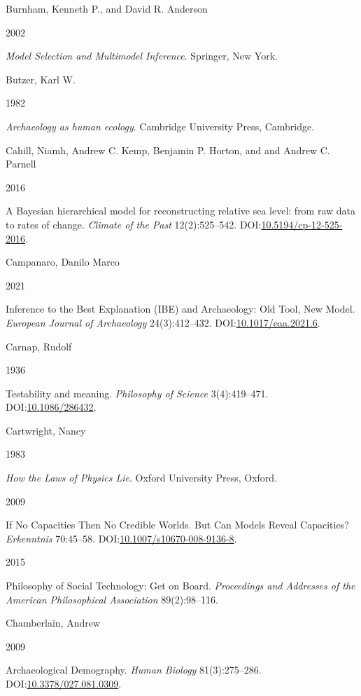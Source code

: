 \documentclass[
  12pt,
  a4paper,
  oneside]{book}
\newlength{\cslhangindent}
\newlength{\csllabelwidth}
\newlength{\cslentryspacingunit} %
\newenvironment{CSLReferences}[2] %
 {%
  \setlength{\parindent}{0pt}
  \ifodd #1
  \let\oldpar\par
  \def\par{\hangindent=\cslhangindent\oldpar}
  \fi
  \setlength{\parskip}{#2\cslentryspacingunit}
 }%
 {}
\newcommand{\CSLBlock}[1]{#1\hfill\break}
\newcommand{\CSLLeftMargin}[1]{\parbox[t]{\csllabelwidth}{#1}}
\newcommand{\CSLRightInline}[1]{\parbox[t]{\linewidth - \csllabelwidth}{#1}\break}
\begin{document}
\begin{CSLReferences}{0}{0}
\leavevmode{}%
\CSLBlock{Burnham, Kenneth P., and David R. Anderson}
\CSLLeftMargin{ 2002}%
\CSLRightInline{\emph{{Model Selection and Multimodel Inference}}. Springer, New York.}

\leavevmode{}%
\CSLBlock{Butzer, Karl W.}
\CSLLeftMargin{ 1982}%
\CSLRightInline{\emph{{Archaeology as human ecology}}. Cambridge University Press, Cambridge.}

\leavevmode{}%
\CSLBlock{Cahill, Niamh, Andrew C. Kemp, Benjamin P. Horton, and and Andrew C. Parnell}
\CSLLeftMargin{ 2016}%
\CSLRightInline{A Bayesian hierarchical model for reconstructing relative sea level: from raw data to rates of change. \emph{Climate of the Past} 12(2):525--542. DOI:\href{https://doi.org/10.5194/cp-12-525-2016}{10.5194/cp-12-525-2016}.}

\leavevmode{}%
\CSLBlock{Campanaro, Danilo Marco}
\CSLLeftMargin{ 2021}%
\CSLRightInline{{Inference to the Best Explanation (IBE) and Archaeology: Old Tool, New Model}. \emph{European Journal of Archaeology} 24(3):412--432. DOI:\href{https://doi.org/10.1017/eaa.2021.6}{10.1017/eaa.2021.6}.}

\leavevmode{}%
\CSLBlock{Carnap, Rudolf}
\CSLLeftMargin{ 1936}%
\CSLRightInline{Testability and meaning. \emph{Philosophy of Science} 3(4):419--471. DOI:\href{https://doi.org/10.1086/286432}{10.1086/286432}.}

\leavevmode{}%
\CSLBlock{Cartwright, Nancy}
\CSLLeftMargin{ 1983}%
\CSLRightInline{\emph{{How the Laws of Physics Lie}}. Oxford University Press, Oxford.}

\leavevmode{}%
\CSLLeftMargin{ 2009 }%
\CSLRightInline{{If No Capacities Then No Credible Worlds. But Can Models Reveal Capacities?} \emph{Erkenntnis} 70:45--58. DOI:\href{https://doi.org/10.1007/s10670-008-9136-8}{10.1007/s10670-008-9136-8}.}

\leavevmode{}%
\CSLLeftMargin{ 2015 }%
\CSLRightInline{{Philosophy of Social Technology: Get on Board}. \emph{Proceedings and Addresses of the American Philosophical Association} 89(2):98--116.}

\leavevmode{}%
\CSLBlock{Chamberlain, Andrew}
\CSLLeftMargin{ 2009}%
\CSLRightInline{{Archaeological Demography}. \emph{Human Biology} 81(3):275--286. DOI:\href{https://doi.org/10.3378/027.081.0309}{10.3378/027.081.0309}.}


\end{CSLReferences}
\end{document}
